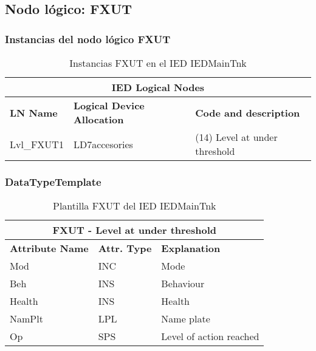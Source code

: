 
\subsection{Nodo l\'ogico: 			 FXUT}

    \subsubsection{Instancias del nodo l\'ogico FXUT}
    \begin{table}[H]
    \begin{center}
    \begin{tabular}{|l|l|p{6.8cm}|}
            \hline
            \multicolumn{3}{|c|}{\cellcolor[gray]{0.8} \textbf{IED Logical Nodes} } \\
            \hline
            \textbf{LN Name} & \textbf{Logical Device Allocation} & \textbf{Code and description} \\
            \hline
            Lvl\_FXUT1 & LD7accesories & (14) Level at under threshold \\
            \hline
    \end{tabular}
    \caption{Instancias FXUT en el IED IEDMainTnk}
    \label{table:lnInstFXUT_1}
    \end{center}
    \end{table}
    
    
    
    \subsubsection{DataTypeTemplate}
    \begin{table}[H]
    \begin{center}
    \begin{tabular}{|l|l|p{8.5cm}|}
            \hline
            \multicolumn{3}{|c|}{\cellcolor[gray]{0.8} \textbf{ FXUT}  - Level at under threshold} \\
            \hline
            \textbf{Attribute Name} & \textbf{Attr. Type} & \textbf{Explanation} \\
            \hline 
            Mod & INC & Mode \\
            \hline
            Beh & INS & Behaviour \\
            \hline
            Health & INS & Health \\
            \hline
            NamPlt & LPL & Name plate \\
            \hline
            Op & SPS & Level of action reached \\
            \hline
    \end{tabular}
    \caption{Plantilla FXUT del IED IEDMainTnk}
    \label{table:lnTypeFXUT_1}
    \end{center}
    \end{table}
    
    
    